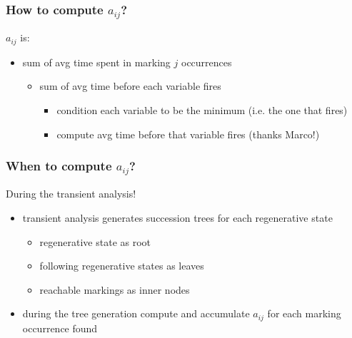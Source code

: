 \begin{frame}
  \frametitle{How to compute $a_{ij}$?}
  $a_{ij}$ is:
  \begin{itemize}
  \item sum of avg time spent in marking $j$ occurrences
    \begin{itemize}
    \item sum of avg time before each variable fires
      \begin{itemize}
      \item condition each variable to be the minimum (i.e. the one
        that fires)
      \item compute avg time before that variable fires (thanks Marco!)
      \end{itemize}
    \end{itemize}
  \end{itemize}
  \begin{center}
  \end{center}
\end{frame}

\begin{frame}
  \frametitle{When to compute $a_{ij}$?}
  During the transient analysis!
  \begin{itemize}
  \item transient analysis generates succession trees for each
    regenerative state
    \begin{itemize}
    \item regenerative state as root
    \item following regenerative states as leaves
    \item reachable markings as inner nodes
    \end{itemize}
  \item during the tree generation compute and accumulate $a_{ij}$ for
    each marking occurrence found
  \end{itemize}
\end{frame}
